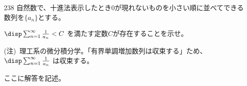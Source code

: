 \begin{prob}{238}{}{}
 自然数で、十進法表示したとき0が現れないものを小さい順に並べてできる数列を$\{a_n\}$とする。

 $\disp \sum_{n=1}^\infty \frac{1}{a_n} < C$ を満たす定数$C$が存在することを示せ。

 {\tiny (注)~理工系の微分積分学。「有界単調増加数列は収束する」ため、$\disp \sum_{n=1}^\infty \frac{1}{a_n}$ は収束する。}
\end{prob}
ここに解答を記述。